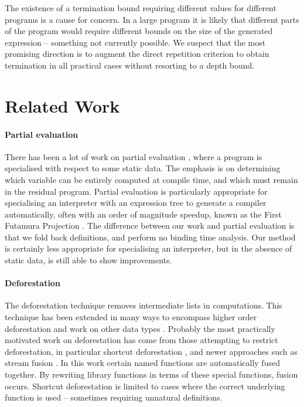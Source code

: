 \documentclass{llncs}
\begin{document}
The existence of a termination bound requiring different values for different programs is a cause for concern. In a large program it is likely that different parts of the program would require different bounds on the size of the generated expression -- something not currently possible. We suspect that the most promising direction is to augment the direct repetition criterion to obtain termination in all practical cases without resorting to a depth bound.

\section{Related Work}
\label{sec:related}

\paragraph{Partial evaluation} There has been a lot of work on partial evaluation \cite{jones:partial_evaluation}, where a program is specialised with respect to some static data. The emphasis is on determining which variable can be entirely computed at compile time, and which must remain in the residual program. Partial evaluation is particularly appropriate for specialising an interpreter with an expression tree to generate a compiler automatically, often with an order of magnitude speedup, known as the First Futamura Projection \cite{futanama:projections}. The difference between our work and partial evaluation is that we fold back definitions, and perform no binding time analysis. Our method is certainly less appropriate for specialising an interpreter, but in the absence of static data, is still able to show improvements.

\paragraph{Deforestation} The deforestation technique \cite{wadler:deforestation} removes intermediate lists in computations. This technique has been extended in many ways to encompass higher order deforestation \cite{marlow:higher_order_deforestation} and work on other data types \cite{coutts:string_fusion}. Probably the most practically motivated work on deforestation has come from those attempting to restrict deforestation, in particular shortcut deforestation \cite{gill:shortcut_deforestation}, and newer approaches such as stream fusion \cite{coutts:stream_fusion}. In this work certain named functions are automatically fused together. By rewriting library functions in terms of these special functions, fusion occurs. Shortcut deforestation is limited to cases where the correct underlying function is used -- sometimes requiring unnatural definitions.
\end{document}
